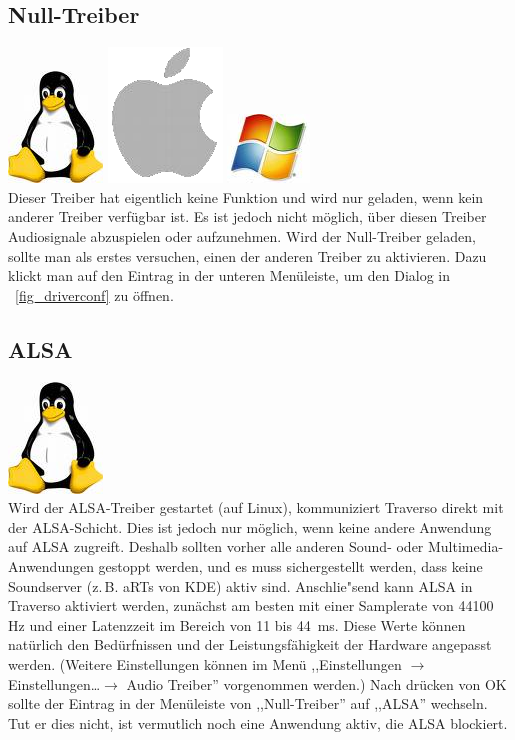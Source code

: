 \subsection{Null-Treiber}
\includegraphics[height=\baselineskip]{images/tux.png}
\includegraphics[height=\baselineskip]{images/mac.png}
\includegraphics[height=\baselineskip]{images/win.png}
\\
Dieser Treiber hat eigentlich keine Funktion und wird nur geladen, wenn kein anderer Treiber verfügbar ist. Es ist jedoch nicht möglich, über diesen Treiber Audiosignale abzuspielen oder aufzunehmen. Wird der Null-Treiber geladen, sollte man als erstes versuchen, einen der anderen Treiber zu aktivieren. Dazu klickt man auf den Eintrag in der unteren Menüleiste, um den Dialog in \FigT\ \ref{fig_driverconf} zu öffnen.

\subsection{ALSA}
\includegraphics[height=\baselineskip]{images/tux.png}
\\
Wird der ALSA-Treiber gestartet (auf Linux), kommuniziert Traverso direkt mit der ALSA-Schicht. Dies ist jedoch nur möglich, wenn keine andere Anwendung auf ALSA zugreift. Deshalb sollten vorher alle anderen Sound- oder Multimedia-Anwendungen gestoppt werden, und es muss sichergestellt werden, dass keine Soundserver (z.\,B. aRTs von KDE) aktiv sind. Anschlie"send kann ALSA in Traverso aktiviert werden, zunächst am besten mit einer Samplerate von 44100 Hz und einer Latenzzeit im Bereich von 11 bis 44~ms. Diese Werte können natürlich den Bedürfnissen und der Leistungsfähigkeit der Hardware angepasst werden. (Weitere Einstellungen können im Menü ,,Einstellungen $\rightarrow$ Einstellungen\dots $\rightarrow$ Audio Treiber'' vorgenommen werden.) Nach drücken von OK sollte der Eintrag in der Menüleiste von ,,Null-Treiber'' auf ,,ALSA'' wechseln. Tut er dies nicht, ist vermutlich noch eine Anwendung aktiv, die ALSA blockiert.

